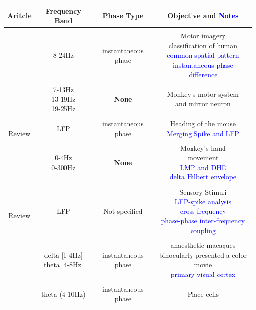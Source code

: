 \documentclass[8pt,a4paper]{article}
\begin{document}
\begin{table}[H]
    \centering
    \begin{tabular}{cccc}
        \hline
        Aritcle & Frequency Band & Phase Type & Objective and \textcolor{blue}{Notes}  \\
        \hline \\
        \makecell{\cite{kumar2018}} & 8-24Hz  & instantaneous phase & \makecell{Motor imagery \\ classification of human \\ \textcolor{blue}{common spatial pattern} \\ \textcolor{blue}{instantaneous phase difference}   } \\ \\
        \makecell{\cite{coude2014}} & \makecell{7-13Hz\\13-19Hz\\19-25Hz} & \textbf{None} & \makecell{Monkey's motor system\\and mirror neuron} \\ \\
        \makecell{\cite{quiroga2009}\\Review} & LFP & instantaneous phase &  \makecell{ Heading of the mouse  \\  \textcolor{blue}{Merging Spike and LFP}} \\ \\
        \makecell{\cite{ahmadi2019}} & \makecell{0-4Hz\\ 0-300Hz} & \textbf{None} & \makecell{ Monkey's hand \\ movement \\  \textcolor{blue}{LMP and DHE} \\ \textcolor{blue}{delta Hilbert envelope} }\\ \\
        \makecell{\cite{einevoll2013}\\Review} & LFP & Not specified & \makecell{ Sensory Stimuli \\ \textcolor{blue}{LFP-spike analysis} \\ \textcolor{blue}{cross-frequency} \\  \textcolor{blue}{phase-phase inter-frequency coupling} } \\ \\
        \makecell{\cite{cattani2015}} &  \makecell{ delta [1-4Hz] \\ theta [4-8Hz] }& instantaneous phase &  \makecell{anaesthetic macaques \\ binocularly presented a color movie \\ \textcolor{blue}{primary visual cortex} }  \\ \\
        \makecell{\cite{siapas2005}} & theta (4-10Hz)  & instantaneous phase & Place cells  \\
    \end{tabular}
\end{table}
\end{document}
